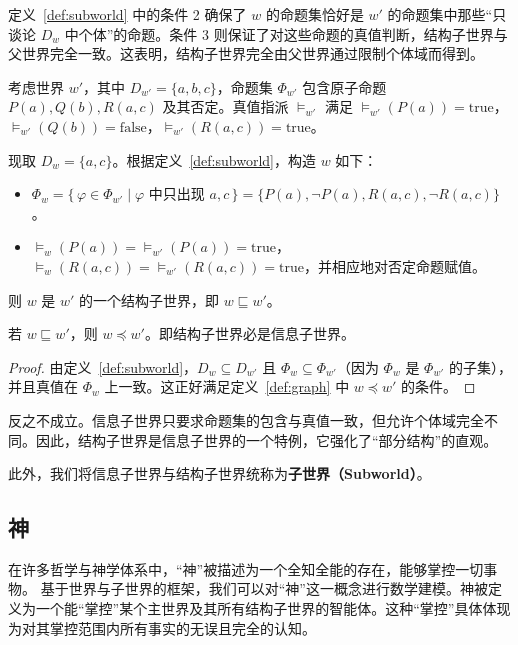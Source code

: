 \begin{remark}
    定义~\ref{def:subworld} 中的条件 2 确保了 $w$ 的命题集恰好是 $w'$ 的命题集中那些“只谈论 $D_w$ 中个体”的命题。条件 3 则保证了对这些命题的真值判断，结构子世界与父世界完全一致。这表明，结构子世界完全由父世界通过限制个体域而得到。
\end{remark}

\begin{example}\label{ex:subworld}
    考虑世界 $w'$，其中 $D_{w'} = \{a, b, c\}$，命题集 $\Phi_{w'}$ 包含原子命题 $P(a), Q(b), R(a,c)$ 及其否定。真值指派 $\models_{w'}$ 满足 $\models_{w'}(P(a)) = \text{true}$，$\models_{w'}(Q(b)) = \text{false}$，$\models_{w'}(R(a,c)) = \text{true}$。

    现取 $D_w = \{a, c\}$。根据定义~\ref{def:subworld}，构造 $w$ 如下：
    \begin{itemize}
        \item $\Phi_w = \{\, \varphi \in \Phi_{w'} \mid \text{$\varphi$ 中只出现 $a, c$} \,\} = \{P(a), \neg P(a), R(a,c), \neg R(a,c)\}$。
        \item $\models_w(P(a)) = \models_{w'}(P(a)) = \text{true}$，$\models_w(R(a,c)) = \models_{w'}(R(a,c)) = \text{true}$，并相应地对否定命题赋值。
    \end{itemize}
    则 $w$ 是 $w'$ 的一个结构子世界，即 $w \sqsubseteq w'$。
\end{example}

\begin{theorem}\label{lemma:sub-info}
    若 $w \sqsubseteq w'$，则 $w \preceq w'$。即结构子世界必是信息子世界。
\end{theorem}
\begin{proof}
    由定义~\ref{def:subworld}，$D_w \subseteq D_{w'}$ 且 $\Phi_w \subseteq \Phi_{w'}$（因为 $\Phi_w$ 是 $\Phi_{w'}$ 的子集），并且真值在 $\Phi_w$ 上一致。这正好满足定义~\ref{def:graph} 中 $w \preceq w'$ 的条件。
\end{proof}

\begin{remark}
    反之不成立。信息子世界只要求命题集的包含与真值一致，但允许个体域完全不同。因此，结构子世界是信息子世界的一个特例，它强化了“部分结构”的直观。
\end{remark}

此外，我们将信息子世界与结构子世界统称为\textbf{子世界（Subworld）}。

\subsection{神}\label{subsec:god}
在许多哲学与神学体系中，“神”被描述为一个全知全能的存在，能够掌控一切事物。
基于世界与子世界的框架，我们可以对“神”这一概念进行数学建模。神被定义为一个能“掌控”某个主世界及其所有结构子世界的智能体。这种“掌控”具体体现为对其掌控范围内所有事实的无误且完全的认知。

